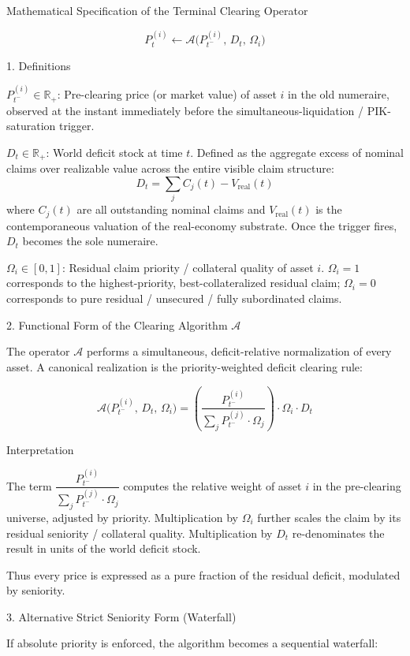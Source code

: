 Mathematical Specification of the Terminal Clearing Operator

\[
P_t^{(i)} \leftarrow \mathcal{A}\bigl(P_{t^-}^{(i)},\, D_t,\, \Omega_i\bigr)
\]

1. Definitions

\( P_{t^-}^{(i)} \in \mathbb{R}_+ \):  
  Pre-clearing price (or market value) of asset \(i\) in the old numeraire, observed at the instant immediately before the simultaneous-liquidation / PIK-saturation trigger.

\( D_t \in \mathbb{R}_+ \):  
  World deficit stock at time \(t\). Defined as the aggregate excess of nominal claims over realizable value across the entire visible claim structure:
  \[
  D_t = \sum_j C_j(t) - V_{\text{real}}(t)
  \]
  where \(C_j(t)\) are all outstanding nominal claims and \(V_{\text{real}}(t)\) is the contemporaneous valuation of the real-economy substrate. Once the trigger fires, \(D_t\) becomes the sole numeraire.

\( \Omega_i \in [0,1] \):  
  Residual claim priority / collateral quality of asset \(i\).  
  \(\Omega_i = 1\) corresponds to the highest-priority, best-collateralized residual claim;  
  \(\Omega_i = 0\) corresponds to pure residual / unsecured / fully subordinated claims.

2. Functional Form of the Clearing Algorithm \(\mathcal{A}\)

The operator \(\mathcal{A}\) performs a simultaneous, deficit-relative normalization of every asset. A canonical realization is the priority-weighted deficit clearing rule:

\[
\mathcal{A}\bigl(P_{t^-}^{(i)},\, D_t,\, \Omega_i\bigr)
=
\left(
\frac{P_{t^-}^{(i)}}{\sum_j P_{t^-}^{(j)} \cdot \Omega_j}
\right)
\cdot
\Omega_i
\cdot
D_t
\]

Interpretation

The term \(\dfrac{P_{t^-}^{(i)}}{\sum_j P_{t^-}^{(j)} \cdot \Omega_j}\) computes the relative weight of asset \(i\) in the pre-clearing universe, adjusted by priority.
Multiplication by \(\Omega_i\) further scales the claim by its residual seniority / collateral quality.
Multiplication by \(D_t\) re-denominates the result in units of the world deficit stock.

Thus every price is expressed as a pure fraction of the residual deficit, modulated by seniority.

3. Alternative Strict Seniority Form (Waterfall)

If absolute priority is enforced, the algorithm becomes a sequential waterfall:

